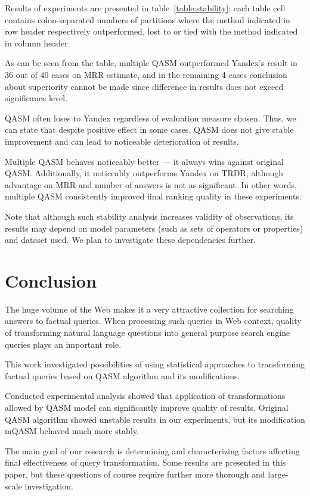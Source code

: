 \documentclass{article}
\begin{document}
Results of experiments are presented in table~\ref{table:stability}:
each table cell contains colon-separated numbers of partitions
where the method indicated in row header
respectively outperformed, lost to or tied with
the method indicated in column header.

As can be seen from the table, multiple QASM outperformed Yandex's result in 36 out of 40 cases on
MRR estimate, and in the remaining 4 cases conclusion about superiority cannot be made
since difference in results does not exceed significance level.

QASM often loses to Yandex regardless of
evaluation measure chosen. Thus, we can state that despite
positive effect in some cases, QASM does not give stable improvement and
can lead to noticeable deterioration of results.

Multiple QASM behaves noticeably better --- it always wins against
original QASM. Additionally, it noticeably outperforms Yandex on TRDR, although
advantage on MRR and number of answers is not as significant.
In other words, multiple QASM
consistently improved final ranking quality in these experiments.

Note that although such stability analysis increases
validity of observations, its results may depend on
model parameters (such as sets of operators or properties)
and dataset used. We plan to investigate these dependencies further.

\section{Conclusion}

The huge volume of the Web makes it a very attractive collection for
searching answers to factual queries. When processing such queries in
Web context, quality of transforming natural language questions into
general purpose search engine queries plays an important role.

This work investigated possibilities of using statistical
approaches to transforming factual queries
based on QASM algorithm and its modifications.

Conducted experimental analysis showed that application of
transformations allowed by QASM model can significantly improve
quality of results. Original QASM algorithm
showed unstable results in our experiments,
but its modification mQASM behaved much more stably.

The main goal of our research is determining and
characterizing factors affecting final effectiveness of
query transformation. Some results are presented in this
paper, but these questions of course require further
more thorough and large-scale investigation.
\end{document}
